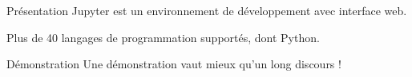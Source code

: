 \begin{frame}{Présentation}
  Jupyter est un environnement de développement avec interface web.

  Plus de 40 langages de programmation supportés, dont Python.

\end{frame}

\begin{frame}{Démonstration}
  Une démonstration vaut mieux qu'un long discours !

\end{frame}
